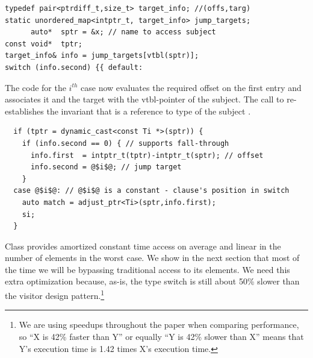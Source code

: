 \begin{lstlisting}
typedef pair<ptrdiff_t,size_t> target_info; //(offs,targ)
static unordered_map<intptr_t, target_info> jump_targets;
      auto*  sptr = &x; // name to access subject
const void*  tptr; 
target_info& info = jump_targets[vtbl(sptr)];
switch (info.second) {{ default: 
\end{lstlisting}

\noindent
The code for the $i^{th}$ case now evaluates the required offset on the first 
entry and associates it and the target with the vtbl-pointer of the subject.
The call to  re-establishes the invariant that 
 is a reference to type  of the subject .

\begin{lstlisting}
  if (tptr = dynamic_cast<const Ti *>(sptr)) {
    if (info.second == 0) { // supports fall-through
      info.first  = intptr_t(tptr)-intptr_t(sptr); // offset
      info.second = @$i$@; // jump target
    }
  case @$i$@: // @$i$@ is a constant - clause's position in switch
    auto match = adjust_ptr<Ti>(sptr,info.first);
    si;
  }
\end{lstlisting}

\noindent
%

\noindent
Class  provides amortized constant time access on 
average and linear in the number of elements in the worst case. We show in the 
next section that most of the time we will be bypassing traditional access to 
its elements. We need this extra optimization because, as-is, the type switch is 
still about 50\% slower than the visitor design pattern.\footnote{We are using 
speedups throughout the paper when comparing performance, so ``X is 42\% faster 
than Y'' or equally ``Y is 42\% slower than X'' means that Y's execution time is 
1.42 times X's execution time.}

